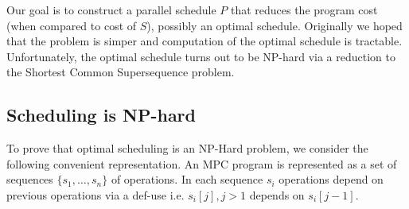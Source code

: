 Our goal is to construct a parallel schedule $P$ that reduces the program cost (when compared to cost of $S$), possibly an optimal schedule. 
Originally we hoped that the problem is simper and computation of the optimal schedule is tractable. Unfortunately, the optimal schedule turns out to be NP-hard via a reduction 
to the Shortest Common Supersequence problem.



\subsection{Scheduling is NP-hard}
\label{sec:np}

To prove that optimal scheduling is an NP-Hard problem, we consider the following convenient representation. An MPC program is represented as a set of sequences $\{s_1, \dots, s_n\}$ of operations. 
In each sequence $s_i$ operations depend on previous operations via a def-use i.e. $s_i[j], j > 1$ depends on $s_i[j-1]$. 

